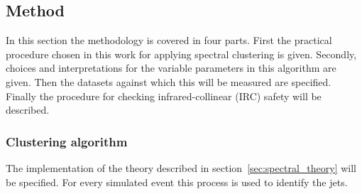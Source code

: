 \subsection{Method}
In this section the methodology is covered in four parts.
First the practical procedure chosen in this work for applying spectral clustering is given.
Secondly, choices and interpretations for the variable parameters in this algorithm are given.
Then the datasets against which this will be measured are specified.
Finally the procedure for checking infrared-collinear (IRC) safety will be described.


\subsubsection{Clustering algorithm}\label{sec:spectralmethodalgo}
    The implementation of the theory described in section~\ref{sec:spectral_theory} will be specified.
    For every simulated event this process is used to identify the jets.

